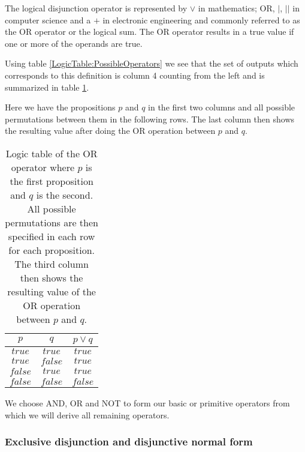                 The logical disjunction operator is represented by $\vee$ in mathematics; OR, $\vert$, $\vert \vert$  in computer science and a $+$ in electronic engineering and commonly referred to as the OR operator or the logical sum. The OR operator results in a true value if one or more of the operands are true.
                
                Using table \ref{LogicTable:PossibleOperators} we see that the set of outputs which corresponds to this definition is column 4 counting from the left and is summarized in table \ref{LogicTable:OR}. 
                
                Here we have the propositions $p$ and $q$ in the first two columns and all possible permutations between them in the following rows. The last column then shows the resulting value after doing the OR operation between $p$ and $q$.
                
                \begin{table}[h!]
                    \centering
                    \begin{tabular}{|c|c|c|}
                    	\hline
                    	  $p$   &   $q$   & $p \vee q$ \\ \hline
                    	$true$  & $true$  &   $true$   \\ \hline
                    	$true$  & $false$ &   $true$   \\ \hline
                    	$false$ & $true$  &   $true$   \\ \hline
                    	$false$ & $false$ &  $false$   \\ \hline
                    \end{tabular}
                    \caption{Logic table of the OR operator where $p$ is the first proposition and $q$ is the second. All possible permutations are then specified in each row for each proposition. The third column then shows the resulting value of the OR operation between $p$ and $q$.}
                    \label{LogicTable:OR}
                \end{table}
            
                We choose AND, OR and NOT to form our basic or primitive operators from which we will derive all remaining operators.
                
            \subsubsection{Exclusive disjunction and disjunctive normal form}
                
